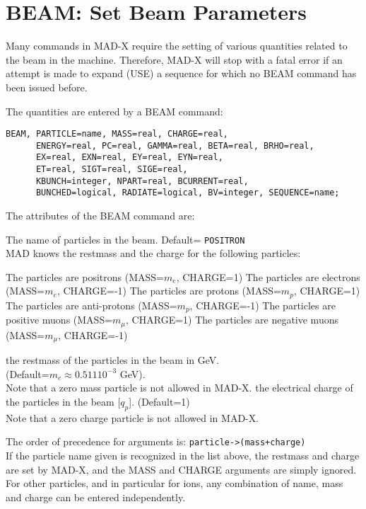 %
\section{BEAM: Set Beam Parameters}
\label{sec:beam}
Many commands in MAD-X require the setting of various quantities related
to the beam in the machine. Therefore, MAD-X will stop with a fatal
error if an attempt is made to expand (USE) a sequence for which no BEAM
command has been issued before.  

The quantities are entered by a BEAM command: 
\begin{verbatim}
BEAM, PARTICLE=name, MASS=real, CHARGE=real,
      ENERGY=real, PC=real, GAMMA=real, BETA=real, BRHO=real,
      EX=real, EXN=real, EY=real, EYN=real,
      ET=real, SIGT=real, SIGE=real,
      KBUNCH=integer, NPART=real, BCURRENT=real,
      BUNCHED=logical, RADIATE=logical, BV=integer, SEQUENCE=name;
\end{verbatim} 

The attributes of the BEAM command are: 
\begin{madlist}
   The name of particles in the beam. Default= {\tt POSITRON}\\
  MAD knows the restmass and the charge for the following particles:
  \begin{madlist}
     The particles are positrons (MASS=$m_e$, CHARGE=1)
     The particles are electrons (MASS=$m_e$, CHARGE=-1) 
     The particles are protons (MASS=$m_p$, CHARGE=1)
     The particles are anti-protons (MASS=$m_p$, CHARGE=-1) 
     The particles are positive muons (MASS=$m_{\mu}$, CHARGE=1) 
     The particles are negative muons (MASS=$m_{\mu}$, CHARGE=-1) 
  \end{madlist}
   the restmass of the particles in the beam in GeV. \\
  (Default=$m_e \approx 0.511 10^{-3}$ GeV).\\
  Note that a zero mass particle is not allowed in MAD-X.
  \label{beam_charge} the electrical charge of the
  particles in the beam [$q_p$]. (Default=1) \\
  Note that a zero charge particle is not allowed in MAD-X.
\end{madlist} 
The order of precedence for arguments is:  {\tt particle->(mass+charge)}\\ 
If the particle name given is recognized in the list above, the restmass
and charge are set by MAD-X, and the MASS and CHARGE arguments are
simply ignored. For other particles, and in particular for ions, any
combination of name, mass and charge can be entered independently.
\\


